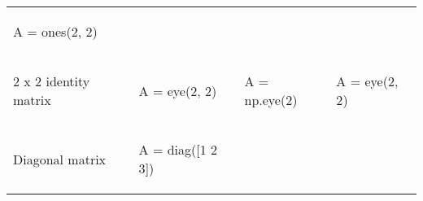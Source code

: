 \documentclass[10pt, landscape]{article}
\newenvironment{Shaded}{}{}
\newcommand{\DecValTok}[1]{\textcolor[rgb]{0.25,0.63,0.44}{{#1}}}
\newcommand{\FloatTok}[1]{\textcolor[rgb]{0.25,0.63,0.44}{{#1}}}
\newcommand{\OperatorTok}[1]{\textcolor[rgb]{0.40,0.40,0.40}{{#1}}}
\newcommand{\NormalTok}[1]{{#1}}
\begin{document}
\begin{multicols}{2}
\begin{tabular}[ ]{@{}llll@{}}
\begin{minipage}[t]{0.20\columnwidth}
\begin{Shaded}
\begin{Highlighting}[]
\NormalTok{A = ones(}\FloatTok{2}\NormalTok{, }\FloatTok{2}\NormalTok{)}
\end{Highlighting}
\end{Shaded}
\strut
\end{minipage}\tabularnewline
\begin{minipage}[t]{0.24\columnwidth}\raggedright\strut
2 x 2 identity matrix\strut
\end{minipage} & \begin{minipage}[t]{0.20\columnwidth}\raggedright\strut
\begin{Shaded}
\begin{Highlighting}[]
\NormalTok{A = eye(}\FloatTok{2}\NormalTok{, }\FloatTok{2}\NormalTok{)}
\end{Highlighting}
\end{Shaded}
\strut
\end{minipage} & \begin{minipage}[t]{0.25\columnwidth}\raggedright\strut
\begin{Shaded}
\begin{Highlighting}[]
\NormalTok{A }\OperatorTok{=} \NormalTok{np.eye(}\DecValTok{2}\NormalTok{)}
\end{Highlighting}
\end{Shaded}
\strut
\end{minipage} & \begin{minipage}[t]{0.20\columnwidth}\raggedright\strut
\begin{Shaded}
\begin{Highlighting}[]
\NormalTok{A = eye(}\FloatTok{2}\NormalTok{, }\FloatTok{2}\NormalTok{)}
\end{Highlighting}
\end{Shaded}
\strut
\end{minipage}\tabularnewline
\begin{minipage}[t]{0.24\columnwidth}\raggedright\strut
Diagonal matrix\strut
\end{minipage} & \begin{minipage}[t]{0.20\columnwidth}\raggedright\strut
\begin{Shaded}
\begin{Highlighting}[]
\NormalTok{A = diag([}\FloatTok{1} \FloatTok{2} \FloatTok{3}\NormalTok{])}
\end{Highlighting}
\end{Shaded}
\strut
\end{minipage} & \begin{minipage}[t]{0.25\columnwidth}\raggedright\strut

\end{minipage}
\end{tabular}
\end{multicols}
\end{document}

